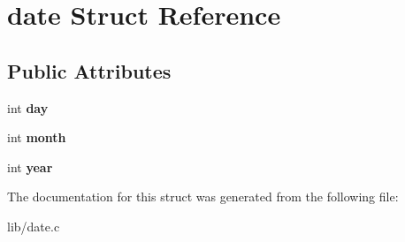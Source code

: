 \hypertarget{structdate}{}\section{date Struct Reference}
\label{structdate}
\subsection*{Public Attributes}
\begin{DoxyCompactItemize}
\item 
int {\bfseries day}\hypertarget{structdate_a2649784269c2be62800d1e4509ed2b56}{}\label{structdate_a2649784269c2be62800d1e4509ed2b56}

\item 
int {\bfseries month}\hypertarget{structdate_a4007efea3f7afe04e9a195dc13f71f38}{}\label{structdate_a4007efea3f7afe04e9a195dc13f71f38}

\item 
int {\bfseries year}\hypertarget{structdate_a12304556327d9ea913a0534a8554107a}{}\label{structdate_a12304556327d9ea913a0534a8554107a}

\end{DoxyCompactItemize}


The documentation for this struct was generated from the following file\+:\begin{DoxyCompactItemize}
\item 
lib/date.\+c\end{DoxyCompactItemize}

